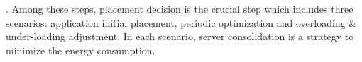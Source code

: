 . Among these steps, placement decision is the crucial step which includes three scenarios: application initial placement, periodic optimization and overloading & under-loading adjustment. In each scenario, server consolidation is a strategy to minimize the energy consumption.





\vspace{5mm}

